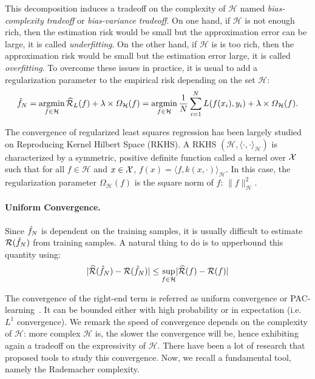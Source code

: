 This decomposition induces a tradeoff on the complexity of $\mathcal{H}$ named \emph{bias-complexity tradeoff} or \emph{bias-variance tradeoff}. On one hand, if $\mathcal{H}$ is not enough rich, then the estimation risk would be small but the approximation error can be large, it is called \emph{underfitting}. On the other hand, if $\mathcal{H}$ is is too rich, then the approximation risk would be small but the estimation error large, it is called \emph{overfitting}. To overcome these issues in practice, it is usual to add a regularization parameter to the empirical risk depending on the set $\mathcal{H}$:
\begin{align*}
    \hat{f}_N = \operatorname*{argmin}_{f\in\mathcal{H}}\widehat{\mathcal{R}}_{L}(f) +\lambda\times\Omega_\mathcal{H}(f)= \operatorname*{argmin}_{f\in\mathcal{H}}\frac{1}{N}\sum_{i=1}^N L(f(x_i),y_i)+\lambda\times\Omega_\mathcal{H}(f).
\end{align*}

The convergence of regularized least squares regression has been largely studied on Reproducing Kernel Hilbert Space (RKHS). A RKHS $(\mathcal{H},\langle\cdot,\cdot\rangle_\mathcal{H})$ is characterized by a symmetric, positive definite function called a kernel over $\mathcal{X}$ such that for all $f\in\mathcal{H}$ and $x\in\mathcal{X}$, $f(x)= \langle f,k(x,\cdot)\rangle_\mathcal{H}$. In this case, the regularization parameter $\Omega_\mathcal{H}(f)$ is the square norm of $f$: $\lVert f\rVert_\mathcal{H}^2$. 


\paragraph{Uniform Convergence.} Since $\hat{f}_N$ is dependent on the training samples, it is usually difficult to estimate $\mathcal{R}(\hat{f}_N)$ from training samples. A natural thing to do is to upperbound this quantity using:
\begin{align*}
    \lvert\widehat{\mathcal{R}}(\hat{f}_N) - \mathcal{R}(\hat{f}_N)\rvert\leq\sup_{f\in\mathcal{H}}    \lvert\widehat{\mathcal{R}}(f) - \mathcal{R}(f)\rvert
\end{align*}

The convergence of the right-end term is referred as uniform convergence or PAC-learning~\citep{valiant1984theory}. It can be bounded either with high probability or in expectation (i.e. $L^1$ convergence). We remark the speed of convergence depends on the complexity of $\mathcal{H}$: more complex $\mathcal{H}$ is, the slower the convergence will be, hence exhibiting again a tradeoff on the expressivity of $\mathcal{H}$. There have been a  lot of research that proposed tools to study this convergence. Now, we recall a fundamental tool, namely the Rademacher complexity.



